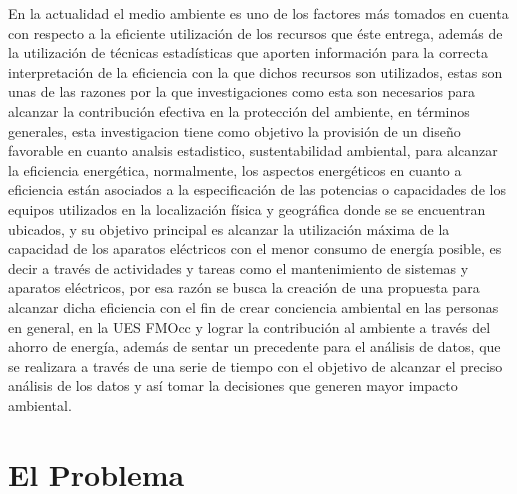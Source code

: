 \documentclass[12pt,letterpaper]{report}
\begin{document}
En la actualidad el medio ambiente es uno de los factores más tomados en cuenta con respecto
a la eficiente utilización de los recursos que éste entrega, además de la utilización de técnicas
estadísticas que aporten información para la correcta interpretación de la eficiencia con la que
dichos recursos son utilizados, estas son unas de las razones por la que investigaciones como esta
son necesarios para alcanzar la contribución efectiva en la protección del ambiente, en
términos generales, esta investigacion tiene como objetivo la provisión de 
un diseño favorable en cuanto analsis estadistico, sustentabilidad
ambiental, para alcanzar la eficiencia energética,
normalmente, los aspectos energéticos en cuanto a eficiencia están asociados a la especificación de
las potencias o capacidades de los equipos utilizados en la localización física y geográfica
donde se se encuentran ubicados, y su objetivo principal es alcanzar la utilización máxima de la
capacidad de los aparatos eléctricos con el menor consumo de energía posible, es decir a
través de actividades y tareas como el mantenimiento de sistemas y aparatos eléctricos, por esa
razón se busca la creación de una propuesta para alcanzar dicha eficiencia con el
fin de crear conciencia ambiental en las personas en general, en la UES FMOcc y lograr la
contribución al ambiente a través del ahorro de energía, además de sentar un precedente para
el análisis de datos, que se realizara a través de una serie de tiempo con el objetivo de alcanzar
el preciso análisis de los datos y así tomar la decisiones que generen mayor impacto ambiental.
\chapter{El Problema}
\end{document}
